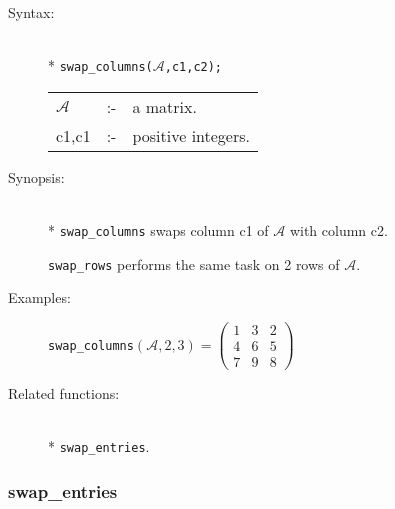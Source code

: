 \begin{description}
\item[Syntax:]\mbox{}\\*
\texttt{swap\_columns($\mathcal{A}$,c1,c2);}\\[2mm]
\begin{tabular}{l l l}
$\mathcal{A}$ &:-& a matrix. \\
c1,c1      &:-& positive integers.
\end{tabular}

\item[Synopsis:]\mbox{}\\*
\texttt{swap\_columns} swaps column c1 of $\mathcal{A}$ with column c2.

\texttt{swap\_rows} performs the same task on 2 rows of $\mathcal{A}$.

\item[Examples:]
\begin{flushleft}
\texttt{swap\_columns}\((\mathcal{A},2,3) =
        \begin{pmatrix} 1 & 3 & 2 \\ 4 & 6 & 5 \\ 7 & 9 & 8 \end{pmatrix}\)
\end{flushleft}

\item[Related functions:]\mbox{}\\*
\texttt{swap\_entries}.
\end{description}


\subsubsection{swap\_entries}
\label{linalg:swap_entries}
\hypertarget{operator:SWAP_ENTRIES}{}

